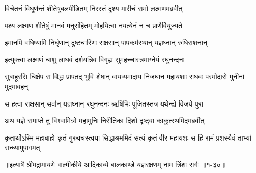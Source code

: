 \twolineshloka
{विचेतनं विघूर्णन्तं शीतेषुबलपीडितम्}
{निरस्तं दृश्य मारीचं रामो लक्ष्मणमब्रवीत्} %

\twolineshloka
{पश्य लक्ष्मण शीतेषुं मानवं मनुसंहितम्}
{मोहयित्वा नयत्येनं न च प्राणैर्वियुज्यते} %

\twolineshloka
{इमानपि वधिष्यामि निर्घृणान् दुष्टचारिणः}
{राक्षसान् पापकर्मस्थान् यज्ञघ्नान् रुधिराशनान्} %

\twolineshloka
{इत्युक्त्वा लक्ष्मणं चाशु लाघवं दर्शयन्निव}
{विगृह्य सुमहच्चास्त्रमाग्नेयं रघुनन्दनः} %

\threelineshloka
{सुबाहूरसि चिक्षेप स विद्धः प्रापतद् भुवि}
{शेषान् वायव्यमादाय निजघान महायशाः}
{राघवः परमोदारो मुनीनां मुदमावहन्} %

\twolineshloka
{स हत्वा राक्षसान् सर्वान् यज्ञघ्नान् रघुनन्दनः}
{ऋषिभिः पूजितस्तत्र यथेन्द्रो विजये पुरा} %

\twolineshloka
{अथ यज्ञे समाप्ते तु विश्वामित्रो महामुनिः}
{निरीतिका दिशो दृष्ट्वा काकुत्स्थमिदमब्रवीत्} %

\threelineshloka
{कृतार्थोऽस्मि महाबाहो कृतं गुरुवचस्त्वया}
{सिद्धाश्रममिदं सत्यं कृतं वीर महायशः}
{स हि रामं प्रशस्यैवं ताभ्यां सन्ध्यामुपागमत्} %


॥इत्यार्षे श्रीमद्रामायणे वाल्मीकीये आदिकाव्ये बालकाण्डे यज्ञरक्षणम् नाम त्रिंशः सर्गः ॥१-३०॥
